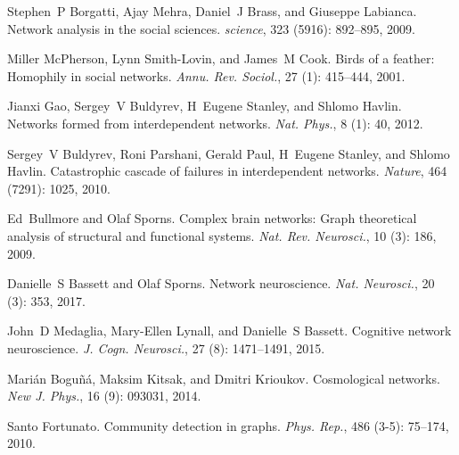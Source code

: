 Stephen~P Borgatti, Ajay Mehra, Daniel~J Brass, and Giuseppe Labianca.
\newblock Network analysis in the social sciences.
\newblock \emph{science}, 323 (5916): 892--895, 2009.

Miller McPherson, Lynn {Smith-Lovin}, and James~M Cook.
\newblock Birds of a feather: {{Homophily}} in social networks.
\newblock \emph{Annu. Rev. Sociol.}, 27 (1): 415--444, 2001.

Jianxi Gao, Sergey~V Buldyrev, H~Eugene Stanley, and Shlomo Havlin.
\newblock Networks formed from interdependent networks.
\newblock \emph{Nat. Phys.}, 8 (1): 40, 2012.

Sergey~V Buldyrev, Roni Parshani, Gerald Paul, H~Eugene Stanley, and Shlomo
Havlin.
\newblock Catastrophic cascade of failures in interdependent networks.
\newblock \emph{Nature}, 464 (7291): 1025, 2010.

Ed~Bullmore and Olaf Sporns.
\newblock Complex brain networks: Graph theoretical analysis of structural and
functional systems.
\newblock \emph{Nat. Rev. Neurosci.}, 10 (3): 186, 2009.

Danielle~S Bassett and Olaf Sporns.
\newblock Network neuroscience.
\newblock \emph{Nat. Neurosci.}, 20 (3): 353, 2017.

John~D Medaglia, Mary-Ellen Lynall, and Danielle~S Bassett.
\newblock Cognitive network neuroscience.
\newblock \emph{J. Cogn. Neurosci.}, 27 (8): 1471--1491,
2015.

Mari{\'a}n Bogu{\~n}{\'a}, Maksim Kitsak, and Dmitri Krioukov.
\newblock Cosmological networks.
\newblock \emph{New J. Phys.}, 16 (9): 093031, 2014.

Santo Fortunato.
\newblock Community detection in graphs.
\newblock \emph{Phys. Rep.}, 486 (3-5): 75--174, 2010.

